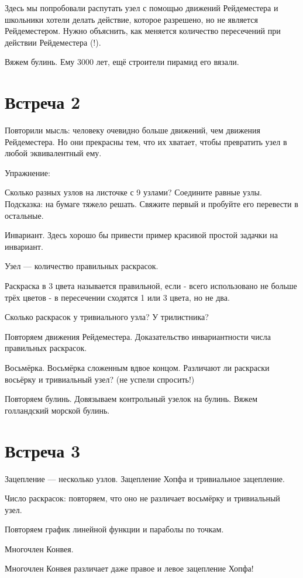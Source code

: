 \documentclass[12pt]{article}
\theoremstyle{definition}
\begin{document}
Здесь мы попробовали распутать узел с помощью движений Рейдеместера и школьники хотели
делать действие, которое разрешено, но не является Рейдеместером.
Нужно объяснить, как меняется количество пересечений при действии Рейдеместера (!).

Вяжем булинь. Ему 3000 лет, ещё строители пирамид его вязали.


\section{Встреча 2}

Повторили мысль: человеку очевидно больше движений, чем движения Рейдеместера.
Но они прекрасны тем, что их хватает, чтобы превратить узел в любой эквивалентный ему.

Упражнение:

Сколько разных узлов на листочке с 9 узлами? Соедините равные узлы.
Подсказка: на бумаге тяжело решать. Свяжите первый и пробуйте его перевести в остальные.


Инвариант. Здесь хорошо бы привести пример красивой простой задачки на инвариант.


Узел — количество правильных раскрасок.

Раскраска в 3 цвета называется правильной, если
- всего использовано не больше трёх цветов
- в пересечении сходятся 1 или 3 цвета, но не два.

Сколько раскрасок у тривиального узла? У трилистника?

Повторяем движения Рейдеместера.
Доказательство инвариантности числа правильных раскрасок.


Восьмёрка. Восьмёрка сложенным вдвое концом.
Различают ли раскраски восьёрку и тривиальный узел? (не успели спросить!)


Повторяем булинь. Довязываем контрольный узелок на булинь.
Вяжем голландский морской булинь.

\section{Встреча 3}


Зацепление — несколько узлов.
Зацепление Хопфа и тривиальное зацепление.

Число раскрасок: повторяем, что оно не различает восьмёрку и тривиальный узел.

Повторяем график линейной функции и параболы по точкам.

Многочлен Конвея.

Многочлен Конвея различает даже правое и левое зацепление Хопфа!
\end{document}
